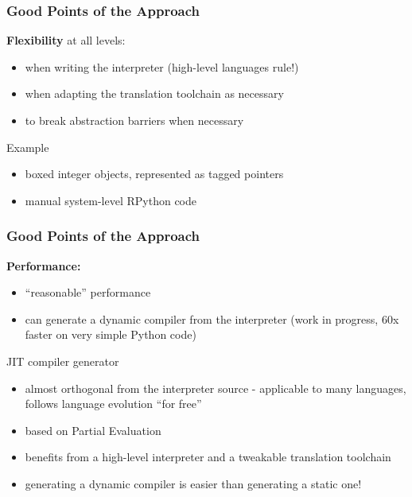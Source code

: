 \documentclass[utf8x]{beamer}
\begin{document}
\begin{frame}
  \frametitle{Good Points of the Approach}
  {\bf Flexibility} at all levels:

  \begin{itemize}
  \item
    when writing the interpreter (high-level languages rule!)
  \item
    when adapting the translation toolchain as necessary
  \item
    to break abstraction barriers when necessary
  \end{itemize}
  \pause
  \begin{block}{
    Example}
    \begin{itemize}
    \item
      boxed integer objects, represented as tagged pointers
    \item
      manual system-level RPython code
    \end{itemize}
  \end{block}
\end{frame}

\begin{frame}
  \frametitle{Good Points of the Approach}
  {\bf Performance:}

  \begin{itemize}
  \item
    ``reasonable'' performance
  \item
    can generate a dynamic compiler from the interpreter
    (work in progress, 60x faster on very simple Python code)
  \end{itemize}
  \pause
  \begin{block}{
    JIT compiler generator}
    \begin{itemize}
    \item
      almost orthogonal from the interpreter source - applicable to many
      languages, follows language evolution ``for free''
    \item
      based on Partial Evaluation
    \item
      benefits from a high-level interpreter and a tweakable translation
      toolchain
    \item
      generating a dynamic compiler is easier than generating a static one!
    \end{itemize}
  \end{block}
\end{frame}
\end{document}
